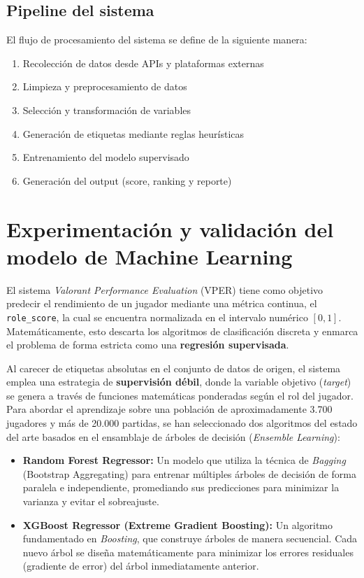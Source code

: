 \documentclass{ULBreport} %
\begin{document}
\section{Pipeline del sistema}

El flujo de procesamiento del sistema se define de la siguiente manera:

\begin{enumerate}
    \item Recolección de datos desde APIs y plataformas externas
    \item Limpieza y preprocesamiento de datos
    \item Selección y transformación de variables
    \item Generación de etiquetas mediante reglas heurísticas
    \item Entrenamiento del modelo supervisado
    \item Generación del output (score, ranking y reporte)
\end{enumerate}

\chapter{Experimentación y validación del modelo de Machine Learning}

El sistema \textit{Valorant Performance Evaluation} (VPER) tiene como objetivo predecir el rendimiento de un jugador mediante una métrica continua, el \texttt{role\_score}, la cual se encuentra normalizada en el intervalo numérico $[0,1]$. Matemáticamente, esto descarta los algoritmos de clasificación discreta y enmarca el problema de forma estricta como una \textbf{regresión supervisada}.

Al carecer de etiquetas absolutas en el conjunto de datos de origen, el sistema emplea una estrategia de \textbf{supervisión débil}, donde la variable objetivo (\textit{target}) se genera a través de funciones matemáticas ponderadas según el rol del jugador. Para abordar el aprendizaje sobre una población de aproximadamente 3.700 jugadores y más de 20.000 partidas, se han seleccionado dos algoritmos del estado del arte basados en el ensamblaje de árboles de decisión (\textit{Ensemble Learning}):

\begin{itemize}
    \item \textbf{Random Forest Regressor:} Un modelo que utiliza la técnica de \textit{Bagging} (Bootstrap Aggregating) para entrenar múltiples árboles de decisión de forma paralela e independiente, promediando sus predicciones para minimizar la varianza y evitar el sobreajuste.
    \item \textbf{XGBoost Regressor (Extreme Gradient Boosting):} Un algoritmo fundamentado en \textit{Boosting}, que construye árboles de manera secuencial. Cada nuevo árbol se diseña matemáticamente para minimizar los errores residuales (gradiente de error) del árbol inmediatamente anterior.
\end{itemize}
\end{document}
